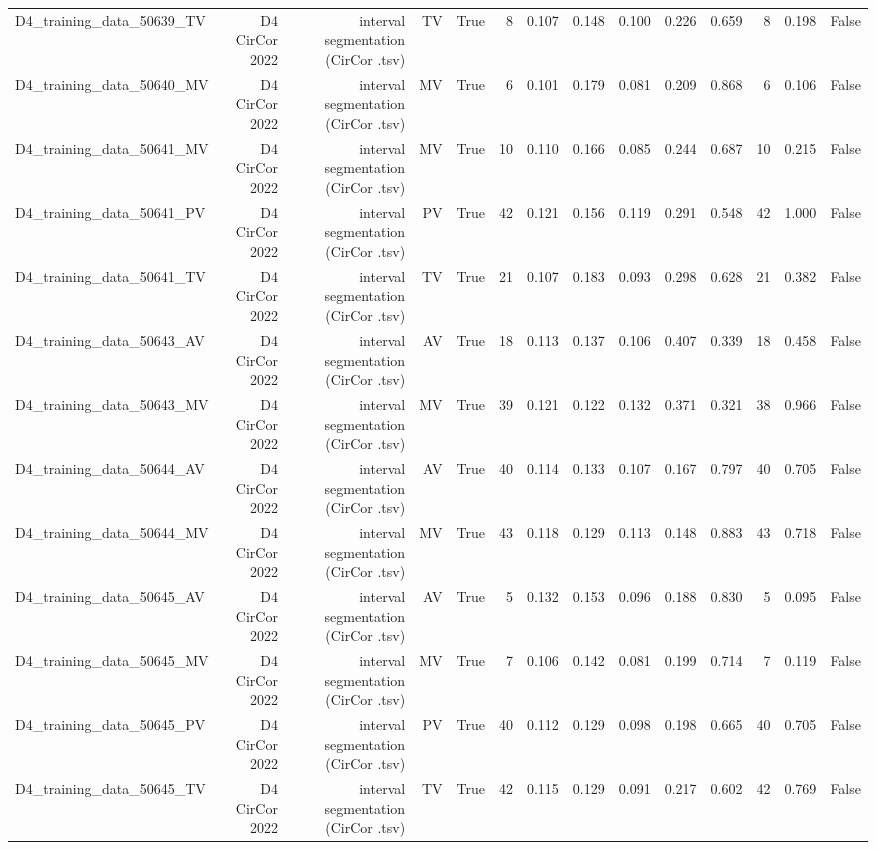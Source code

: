 \begin{table}[htbp]
\begin{tabular}{lrrrrrrrrrrrrr}
    D4\_training\_data\_50639\_TV & D4 CirCor 2022 & interval segmentation (CirCor .tsv) & TV & True & 8 & 0.107 & 0.148 & 0.100 & 0.226 & 0.659 & 8 & 0.198 & False \\
    D4\_training\_data\_50640\_MV & D4 CirCor 2022 & interval segmentation (CirCor .tsv) & MV & True & 6 & 0.101 & 0.179 & 0.081 & 0.209 & 0.868 & 6 & 0.106 & False \\
    D4\_training\_data\_50641\_MV & D4 CirCor 2022 & interval segmentation (CirCor .tsv) & MV & True & 10 & 0.110 & 0.166 & 0.085 & 0.244 & 0.687 & 10 & 0.215 & False \\
    D4\_training\_data\_50641\_PV & D4 CirCor 2022 & interval segmentation (CirCor .tsv) & PV & True & 42 & 0.121 & 0.156 & 0.119 & 0.291 & 0.548 & 42 & 1.000 & False \\
    D4\_training\_data\_50641\_TV & D4 CirCor 2022 & interval segmentation (CirCor .tsv) & TV & True & 21 & 0.107 & 0.183 & 0.093 & 0.298 & 0.628 & 21 & 0.382 & False \\
    D4\_training\_data\_50643\_AV & D4 CirCor 2022 & interval segmentation (CirCor .tsv) & AV & True & 18 & 0.113 & 0.137 & 0.106 & 0.407 & 0.339 & 18 & 0.458 & False \\
    D4\_training\_data\_50643\_MV & D4 CirCor 2022 & interval segmentation (CirCor .tsv) & MV & True & 39 & 0.121 & 0.122 & 0.132 & 0.371 & 0.321 & 38 & 0.966 & False \\
    D4\_training\_data\_50644\_AV & D4 CirCor 2022 & interval segmentation (CirCor .tsv) & AV & True & 40 & 0.114 & 0.133 & 0.107 & 0.167 & 0.797 & 40 & 0.705 & False \\
    D4\_training\_data\_50644\_MV & D4 CirCor 2022 & interval segmentation (CirCor .tsv) & MV & True & 43 & 0.118 & 0.129 & 0.113 & 0.148 & 0.883 & 43 & 0.718 & False \\
    D4\_training\_data\_50645\_AV & D4 CirCor 2022 & interval segmentation (CirCor .tsv) & AV & True & 5 & 0.132 & 0.153 & 0.096 & 0.188 & 0.830 & 5 & 0.095 & False \\
    D4\_training\_data\_50645\_MV & D4 CirCor 2022 & interval segmentation (CirCor .tsv) & MV & True & 7 & 0.106 & 0.142 & 0.081 & 0.199 & 0.714 & 7 & 0.119 & False \\
    D4\_training\_data\_50645\_PV & D4 CirCor 2022 & interval segmentation (CirCor .tsv) & PV & True & 40 & 0.112 & 0.129 & 0.098 & 0.198 & 0.665 & 40 & 0.705 & False \\
    D4\_training\_data\_50645\_TV & D4 CirCor 2022 & interval segmentation (CirCor .tsv) & TV & True & 42 & 0.115 & 0.129 & 0.091 & 0.217 & 0.602 & 42 & 0.769 & False \\

\end{tabular}
\end{table}
